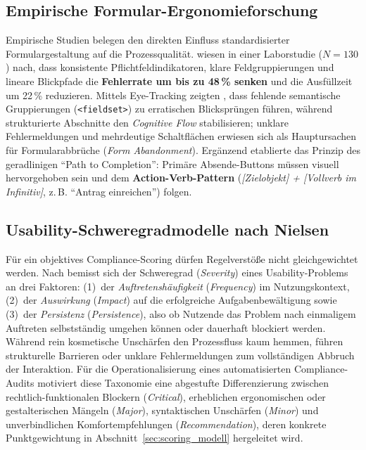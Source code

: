 \subsection{Empirische Formular-Ergonomieforschung}
\label{subsec:empirische_ergonomie}

Empirische Studien belegen den direkten Einfluss standardisierter Formulargestaltung auf die Prozessqualität. \textcite{bargas2010usable} wiesen in einer Laborstudie ($N = 130$) nach, dass konsistente Pflichtfeldindikatoren, klare Feldgruppierungen und lineare Blickpfade die \textbf{Fehlerrate um bis zu 48\,\% senken} und die Ausfüllzeit um 22\,\% reduzieren. Mittels Eye-Tracking zeigten \textcite{seckler2014validation}, dass fehlende semantische Gruppierungen (\texttt{<fieldset>}) zu erratischen Blicksprüngen führen, während strukturierte Abschnitte den \textit{Cognitive Flow} stabilisieren; unklare Fehlermeldungen und mehrdeutige Schaltflächen erwiesen sich als Hauptursachen für Formularabbrüche (\textit{Form Abandonment}). Ergänzend etablierte \textcite{wroblewski2008web} das Prinzip des geradlinigen \enquote{Path to Completion}: Primäre Absende-Buttons müssen visuell hervorgehoben sein und dem \textbf{Action-Verb-Pattern} (\textit{[Zielobjekt] + [Vollverb im Infinitiv]}, z.\,B. \enquote{Antrag einreichen}) folgen.

\subsection{Usability-Schweregradmodelle nach Nielsen}
\label{subsec:nielsen_severity}

Für ein objektives Compliance-Scoring dürfen Regelverstöße nicht gleichgewichtet werden. Nach \textcite{nielsen1994severity} bemisst sich der Schweregrad (\textit{Severity}) eines Usability-Problems an drei Faktoren: (1)~der \textit{Auftretenshäufigkeit} (\textit{Frequency}) im Nutzungskontext, (2)~der \textit{Auswirkung} (\textit{Impact}) auf die erfolgreiche Aufgabenbewältigung sowie (3)~der \textit{Persistenz} (\textit{Persistence}), also ob Nutzende das Problem nach einmaligem Auftreten selbstständig umgehen können oder dauerhaft blockiert werden. Während rein kosmetische Unschärfen den Prozessfluss kaum hemmen, führen strukturelle Barrieren oder unklare Fehlermeldungen zum vollständigen Abbruch der Interaktion. Für die Operationalisierung eines automatisierten Compliance-Audits motiviert diese Taxonomie eine abgestufte Differenzierung zwischen rechtlich-funktionalen Blockern (\textit{Critical}), erheblichen ergonomischen oder gestalterischen Mängeln (\textit{Major}), syntaktischen Unschärfen (\textit{Minor}) und unverbindlichen Komfortempfehlungen (\textit{Recommendation}), deren konkrete Punktgewichtung in Abschnitt~\ref{sec:scoring_modell} hergeleitet wird.


